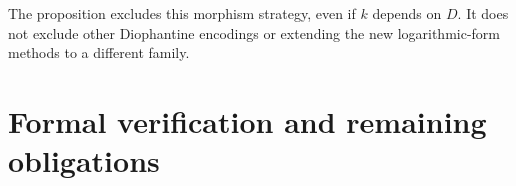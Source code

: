 \documentclass[11pt]{amsart}
\theoremstyle{definition}
\theoremstyle{remark}
\begin{document}
The proposition excludes this morphism strategy, even if $k$ depends on
$D$. It does not exclude other Diophantine encodings or extending the new
logarithmic-form methods to a different family.















\section{Formal verification and remaining obligations}\label{sec:formal}
\end{document}
